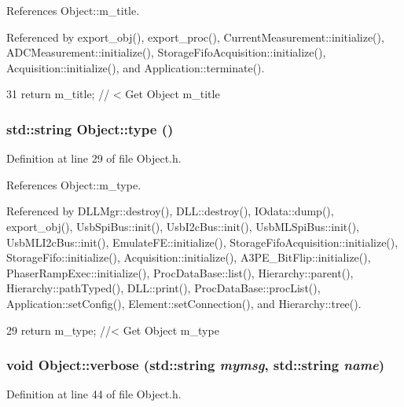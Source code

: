 References Object::m\_\-title.

Referenced by export\_\-obj(), export\_\-proc(), CurrentMeasurement::initialize(), ADCMeasurement::initialize(), StorageFifoAcquisition::initialize(), Acquisition::initialize(), and Application::terminate().


\begin{DoxyCode}
31 { return m_title;      } // < Get Object m_title
\end{DoxyCode}
\hypertarget{classObject_a84f99f70f144a83e1582d1d0f84e4e62}{
\subsubsection[{type}]{\setlength{\rightskip}{0pt plus 5cm}std::string Object::type ()}}
\label{classObject_a84f99f70f144a83e1582d1d0f84e4e62}


Definition at line 29 of file Object.h.

References Object::m\_\-type.

Referenced by DLLMgr::destroy(), DLL::destroy(), IOdata::dump(), export\_\-obj(), UsbSpiBus::init(), UsbI2cBus::init(), UsbMLSpiBus::init(), UsbMLI2cBus::init(), EmulateFE::initialize(), StorageFifoAcquisition::initialize(), StorageFifo::initialize(), Acquisition::initialize(), A3PE\_\-BitFlip::initialize(), PhaserRampExec::initialize(), ProcDataBase::list(), Hierarchy::parent(), Hierarchy::pathTyped(), DLL::print(), ProcDataBase::procList(), Application::setConfig(), Element::setConnection(), and Hierarchy::tree().


\begin{DoxyCode}
29 { return m_type;       } //< Get Object m_type
\end{DoxyCode}
\hypertarget{classObject_a2d4120195317e2a3c6532e8bb9f3da68}{
\subsubsection[{verbose}]{\setlength{\rightskip}{0pt plus 5cm}void Object::verbose (std::string {\em mymsg}, \/  std::string {\em name})}}
\label{classObject_a2d4120195317e2a3c6532e8bb9f3da68}


Definition at line 44 of file Object.h.

